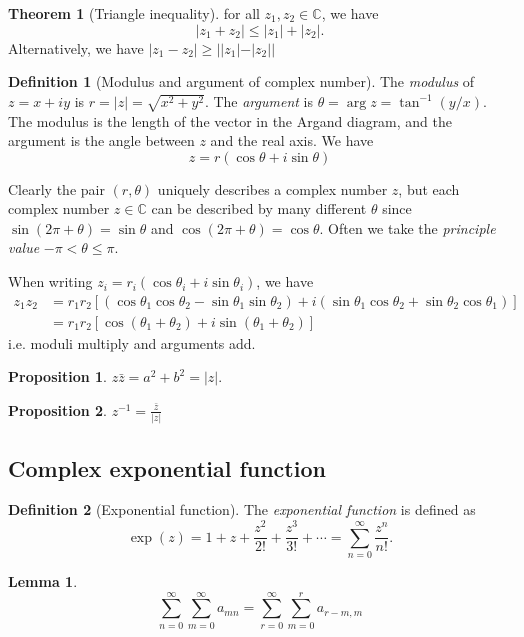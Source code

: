\documentclass[a4paper]{article}
\theoremstyle{definition}
\newtheorem*{prop}{Proposition}
\newtheorem*{thm}{Theorem}
\newtheorem*{defi}{Definition}
\newtheorem*{lemma}{Lemma}
\newcommand{\C}{\mathbb{C}}
\begin{document}
\begin{thm}[Triangle inequality]
  for all $z_1, z_2 \in \C$, we have
  \[
  |z_1 + z_2| \leq |z_1| + |z_2|.
  \]
  Alternatively, we have $|z_1 - z_2|\geq ||z_1| - |z_2||$
\end{thm}

\begin{defi}[Modulus and argument of complex number]
  The \emph{modulus} of $z = x + iy$ is $r = |z| = \sqrt{x^2 + y^2}$. The \emph{argument} is $\theta = \arg z = \tan^{-1} (y/x)$. The modulus is the length of the vector in the Argand diagram, and the argument is the angle between $z$ and the real axis. We have
  \[
  z = r(\cos\theta + i\sin \theta)
  \]

  Clearly the pair $(r, \theta)$ uniquely describes a complex number $z$, but each complex number $z\in \C$ can be described by many different $\theta$ since $\sin (2\pi + \theta) = \sin \theta$ and $\cos(2\pi + \theta) = \cos\theta$. Often we take the \emph{principle value} $-\pi < \theta \leq \pi$.
\end{defi}

When writing $z_i = r_i(\cos\theta_i + i\sin \theta_i)$, we have
\begin{align*}
  z_1z_2 &= r_1r_2[(\cos\theta_1\cos\theta_2 - \sin\theta_1\sin\theta_2) + i(\sin\theta_1\cos\theta_2 + \sin\theta_2\cos\theta_1)]\\
  &= r_1r_2[\cos(\theta_1 + \theta_2) + i\sin(\theta_1+\theta_2)]
\end{align*}
i.e. moduli multiply and arguments add.

\begin{prop}
  $z\bar{z} = a^2 + b^2 = |z|$.
\end{prop}
\begin{prop}
  $z^{-1} = \frac{\bar{z}}{|z|}$
\end{prop}

\subsection{Complex exponential function}
\begin{defi}[Exponential function]
  The \emph{exponential function} is defined as
  \[
  \exp (z) = 1 + z + \frac{z^2}{2!} + \frac{z^3}{3!} + \cdots = \sum_{n = 0}^\infty \frac{z^n}{n!}.
  \]
\end{defi}

\begin{lemma}
  \[
  \sum_{n = 0}^\infty\sum_{m = 0}^\infty a_{mn} = \sum_{r = 0}^\infty\sum_{m = 0}^r a_{r - m, m}
  \]
\end{lemma}
\end{document}

